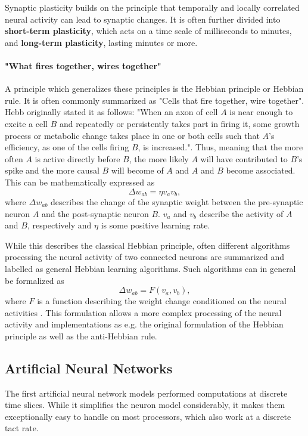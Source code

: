 Synaptic plasticity builds on the principle that temporally and locally correlated neural activity  can lead to synaptic changes.
It is often further divided into \textbf{short-term plasticity}, which acts on a time scale of milliseconds to minutes, and \textbf{long-term plasticity}, lasting minutes or more.


\paragraph{"What fires together, wires together"} \label{c:hebb}
A principle which generalizes these principles is the Hebbian principle or Hebbian rule.
It is often commonly summarized as "Cells that fire together, wire together".
Hebb originally stated it as follows: "When an axon of cell $A$ is near enough to excite a cell $B$ and repeatedly or persistently takes part in firing it, some growth process or metabolic change takes place in one or both cells such that $A$'s efficiency, as one of the cells firing $B$, is increased."\cite{hebb19680}.
Thus, meaning that the more often $A$ is active directly before $B$, the more likely $A$ will have contributed to $B$'s spike and the more causal $B$ will become of $A$ and $A$ and $B$ become associated.
This can be mathematically expressed as
\[
\Delta w_{ab} = \eta v_a v_b ,
\]
where $\Delta w_{ab}$ describes the change of the synaptic weight between the pre-synaptic neuron $A$ and the post-synaptic neuron $B$. 
$v_a$ and $v_b$ describe the activity of $A$ and $B$, respectively and $\eta$ is some positive learning rate. 

While this describes the classical Hebbian principle, often different algorithms processing the neural activity of two connected neurons are summarized and labelled as general Hebbian learning algorithms.
Such algorithms can in general be formalized as
\[
\Delta w_{ab} = F( v_a, v_b) , 
\]
where $F$ is a function describing the weight change conditioned on the neural activities \cite{gerstner2014neuronal}.     
This formulation allows a more complex processing of the neural activity and implementations as e.g. the original formulation of the Hebbian principle as well as the anti-Hebbian rule. 

\subsection{Artificial Neural Networks} \label{c:ann}

The first artificial neural network models performed computations at discrete time slices.
While it simplifies the neuron model considerably, it makes them exceptionally easy to handle on most processors, which also work at a discrete tact rate.

